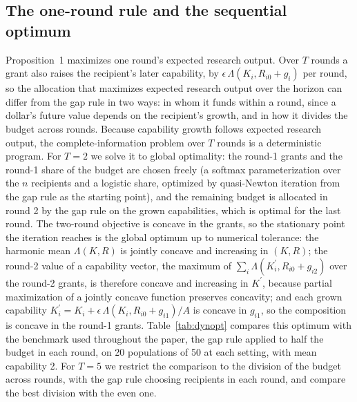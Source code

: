 \subsection*{The one-round rule and the sequential optimum}
Proposition~1 maximizes one round's expected research output. Over $T$ rounds a grant also raises the recipient's later capability, by $\epsilon\,\Lambda(K_i, R_{i0} + g_i)$ per round, so the allocation that maximizes expected research output over the horizon can differ from the gap rule in two ways: in whom it funds within a round, since a dollar's future value depends on the recipient's growth, and in how it divides the budget across rounds. Because capability growth follows expected research output, the complete-information problem over $T$ rounds is a deterministic program. For $T = 2$ we solve it to global optimality: the round-1 grants and the round-1 share of the budget are chosen freely (a softmax parameterization over the $n$ recipients and a logistic share, optimized by quasi-Newton iteration from the gap rule as the starting point), and the remaining budget is allocated in round 2 by the gap rule on the grown capabilities, which is optimal for the last round. The two-round objective is concave in the grants, so the stationary point the iteration reaches is the global optimum up to numerical tolerance: the harmonic mean $\Lambda(K, R)$ is jointly concave and increasing in $(K, R)$; the round-2 value of a capability vector, the maximum of $\sum_i \Lambda(K_i^\prime, R_{i0} + g_{i2})$ over the round-2 grants, is therefore concave and increasing in $K^\prime$, because partial maximization of a jointly concave function preserves concavity; and each grown capability $K_i^\prime = K_i + \epsilon\,\Lambda(K_i, R_{i0} + g_{i1})/A$ is concave in $g_{i1}$, so the composition is concave in the round-1 grants. Table~\ref{tab:dynopt} compares this optimum with the benchmark used throughout the paper, the gap rule applied to half the budget in each round, on 20 populations of 50 at each setting, with mean capability 2. For $T = 5$ we restrict the comparison to the division of the budget across rounds, with the gap rule choosing recipients in each round, and compare the best division with the even one.



